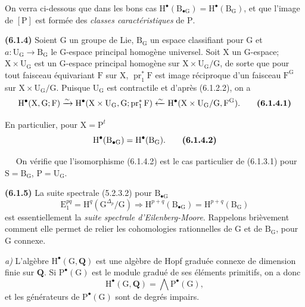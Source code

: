 \documentclass[11pt,leqno]{article}
\newcommand{\Page}[1]{\ifvmode\noindent\else\unskip\ \fi{\footnotesize\textcolor{gray}{[p.\,#1]}}\ \ignorespaces}
\begin{document}
On verra ci-dessous que dans les bons cas \(\mathrm{H}^{\bullet}(\mathrm{B}_{\bullet\mathrm{G}})=\mathrm{H}^{\bullet}(\mathrm{B}_{\mathrm{G}})\), et que l’image de \([\mathrm{P}]\) est formée des \textit{classes caractéristiques} de \(\mathrm{P}\).

\textbf{(6.1.4)} Soient \(\mathrm{G}\) un groupe de Lie, \(\mathrm{B}_{\mathrm{G}}\) un espace classifiant pour \(\mathrm{G}\) et \(a:\mathrm{U}_{\mathrm{G}}\to\mathrm{B}_{\mathrm{G}}\) le \(\mathrm{G}\)-espace principal homogène universel. Soit \(\mathrm{X}\) un \(\mathrm{G}\)-espace; \(\mathrm{X}\times\mathrm{U}_{\mathrm{G}}\) est un \(\mathrm{G}\)-espace principal homogène sur \(\mathrm{X}\times\mathrm{U}_{\mathrm{G}}/\mathrm{G}\), de sorte que pour tout faisceau équivariant \(\mathrm{F}\) sur \(\mathrm{X}\), \(\operatorname{pr}_1^*\mathrm{F}\) est image réciproque d’un faisceau \(\mathrm{F}^{\mathrm{G}}\) sur \(\mathrm{X}\times\mathrm{U}_{\mathrm{G}}/\mathrm{G}\). Puisque \(\mathrm{U}_{\mathrm{G}}\) est contractile et d’après (6.1.2.2), on a
\[
\mathrm{H}^{\bullet}(\mathrm{X},\mathrm{G};\mathrm{F})
\xrightarrow{\sim}
\mathrm{H}^{\bullet}(\mathrm{X}\times\mathrm{U}_{\mathrm{G}},\mathrm{G};
\operatorname{pr}_1^*\mathrm{F})
\xleftarrow{\sim}
\mathrm{H}^{\bullet}(\mathrm{X}\times\mathrm{U}_{\mathrm{G}}/\mathrm{G},\mathrm{F}^{\mathrm{G}}).
\tag*{\textbf{(6.1.4.1)}}
\]

En particulier, pour \(\mathrm{X}=\mathrm{P}^{t}\)
\[
\mathrm{H}^{\bullet}(\mathrm{B}_{\bullet\mathrm{G}})
=\mathrm{H}^{\bullet}(\mathrm{B}_{\mathrm{G}}).
\tag*{\textbf{(6.1.4.2)}}
\]

\Page{18}
On vérifie que l’isomorphisme (6.1.4.2) est le cas particulier de (6.1.3.1) pour \(\mathrm{S}=\mathrm{B}_{\mathrm{G}}\), \(\mathrm{P}=\mathrm{U}_{\mathrm{G}}\).

\textbf{(6.1.5)} La suite spectrale (5.2.3.2) pour \(\mathrm{B}_{\bullet\mathrm{G}}\)
\[
\mathrm{E}_{1}^{pq}=\mathrm{H}^{q}(\mathrm{G}^{\Delta_p}/\mathrm{G})
\Rightarrow
\mathrm{H}^{p+q}(\mathrm{B}_{\bullet\mathrm{G}})
=\mathrm{H}^{p+q}(\mathrm{B}_{\mathrm{G}})
\]
est essentiellement la \textit{suite spectrale d’Eilenberg-Moore}. Rappelons brièvement comment elle permet de relier les cohomologies rationnelles de \(\mathrm{G}\) et de \(\mathrm{B}_{\mathrm{G}}\), pour \(\mathrm{G}\) connexe.

\textit{a)} L’algèbre \(\mathrm{H}^{\bullet}(\mathrm{G},\mathbf{Q})\) est une algèbre de Hopf graduée connexe de dimension finie sur \(\mathbf{Q}\). Si \(\mathrm{P}^{\bullet}(\mathrm{G})\) est le module gradué de ses éléments primitifs, on a donc
\[
\mathrm{H}^{\bullet}(\mathrm{G},\mathbf{Q})
=\mathop{\textstyle\bigwedge}\mathrm{P}^{\bullet}(\mathrm{G}),
\]
et les générateurs de \(\mathrm{P}^{\bullet}(\mathrm{G})\) sont de degrés impairs.
\end{document}
